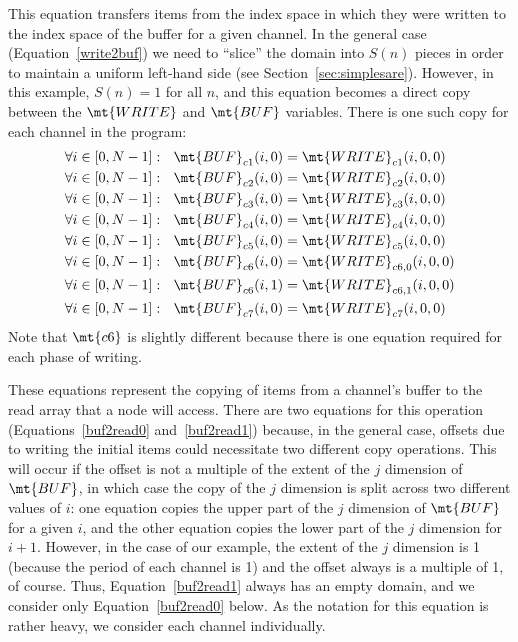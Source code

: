 This equation transfers items from the index space in which they were
written to the index space of the buffer for a given channel.  In the
general case (Equation~\ref{write2buf}) we need to ``slice'' the
domain into $S(n)$ pieces in order to maintain a uniform left-hand
side (see Section~\ref{sec:simplesare}).  However, in this example,
$S(n) = 1$ for all $n$, and this equation becomes a direct copy
between the $\mt{WRITE}$ and $\mt{BUF}$ variables.  There is one
such copy for each channel in the program:
\begin{align*}
\forall i \in [0, N-1]:~~\mt{BUF}_{c1}(i, 0) &= \mt{WRITE}_{c1}(i, 0, 0) \\
\forall i \in [0, N-1]:~~\mt{BUF}_{c2}(i, 0) &= \mt{WRITE}_{c2}(i, 0, 0) \\
\forall i \in [0, N-1]:~~\mt{BUF}_{c3}(i, 0) &= \mt{WRITE}_{c3}(i, 0, 0) \\
\forall i \in [0, N-1]:~~\mt{BUF}_{c4}(i, 0) &= \mt{WRITE}_{c4}(i, 0, 0) \\
\forall i \in [0, N-1]:~~\mt{BUF}_{c5}(i, 0) &= \mt{WRITE}_{c5}(i, 0, 0) \\
\forall i \in [0, N-1]:~~\mt{BUF}_{c6}(i, 0) &= \mt{WRITE}_{{c6}, 0}(i, 0, 0) \\
\forall i \in [0, N-1]:~~\mt{BUF}_{c6}(i, 1) &= \mt{WRITE}_{{c6}, 1}(i, 0, 0) \\
\forall i \in [0, N-1]:~~\mt{BUF}_{c7}(i, 0) &= \mt{WRITE}_{c7}(i, 0, 0)
\end{align*}
Note that $\mt{c6}$ is slightly different because there is one
equation required for each phase of writing.


These equations represent the copying of items from a channel's buffer
to the read array that a node will access.  There are two equations
for this operation (Equations~\ref{buf2read0} and~\ref{buf2read1})
because, in the general case, offsets due to writing the initial items
could necessitate two different copy operations.  This will occur if
the offset is not a multiple of the extent of the $j$ dimension of
$\mt{BUF}$, in which case the copy of the $j$ dimension is split
across two different values of $i$: one equation copies the upper part
of the $j$ dimension of $\mt{BUF}$ for a given $i$, and the other
equation copies the lower part of the $j$ dimension for $i+1$.
However, in the case of our example, the extent of the $j$ dimension
is 1 (because the period of each channel is 1) and the offset always
is a multiple of 1, of course.  Thus, Equation~\ref{buf2read1} always
has an empty domain, and we consider only Equation~\ref{buf2read0}
below.  As the notation for this equation is rather heavy, we consider
each channel individually.

